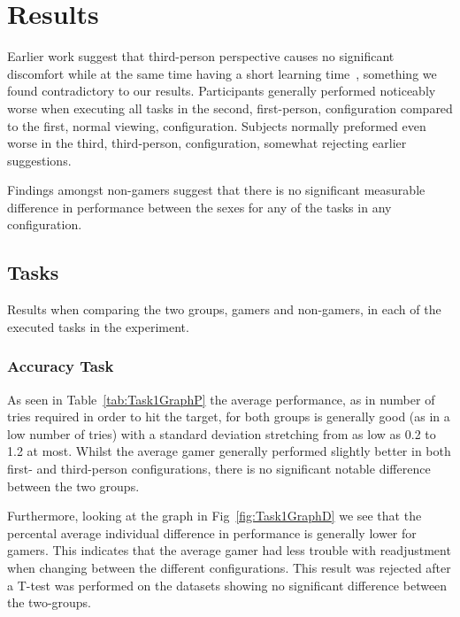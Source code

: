 \documentclass[runningheads,a4paper,oribibl]{llncs}
\begin{document}
\section{Results}
Earlier work suggest that third-person perspective causes no significant discomfort while at the same time having a short learning time~\cite{nakamura20103pi}, something we found contradictory to our results. Participants generally performed noticeably worse when executing all tasks in the second, first-person, configuration compared to the first, normal viewing, configuration. Subjects normally preformed even worse in the third, third-person, configuration, somewhat rejecting earlier suggestions. 

Findings amongst non-gamers suggest that there is no significant measurable difference in performance between the sexes for any of the tasks in any configuration.







\subsection{Tasks}
Results when comparing the two groups, gamers and non-gamers, in each of the executed tasks in the experiment.


\subsubsection{Accuracy Task}
As seen in Table~\ref{tab:Task1GraphP} the average performance, as in number of tries required in order to hit the target, for both groups is generally good (as in a low number of tries) with a standard deviation stretching from as low as 0.2 to 1.2 at most. Whilst the average gamer generally performed slightly better in both first- and third-person configurations, there is no significant notable difference between the two groups.


Furthermore, looking at the graph in Fig~\ref{fig:Task1GraphD} we see that the percental average individual difference in performance is generally lower for gamers. This indicates that the average gamer had less trouble with readjustment when changing between the different configurations. This result was rejected after a T-test was performed on the datasets showing no significant difference between the two-groups.  
\end{document}
